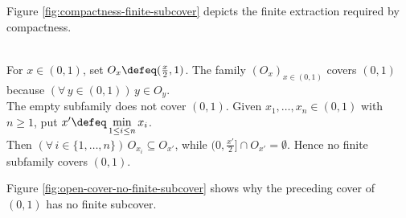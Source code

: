 Figure \ref{fig:compactness-finite-subcover} depicts the finite extraction required by compactness.
\begin{illustrationfigure}[H]
  \centering
  
  \caption{An arbitrary dashed cover of $K$ (left) is reduced to a finite solid subcover (right).}
  \label{fig:compactness-finite-subcover}
\end{illustrationfigure}

\begin{counterexample} \label{cex:open-interval-cover-without-finite-subcover} \\
For $x\in(0,1)$, set $O_x\defeq(\frac{x}{2},1)$. The family $(O_x)_{x\in(0,1)}$ covers $(0,1)$ because $(\forall\,y\in(0,1))\,y\in O_y$.\\
The empty subfamily does not cover $(0,1)$. Given $x_1,\ldots,x_n\in(0,1)$ with $n\geq1$, put $x'\defeq\min\limits_{1\leq i\leq n}x_i$.\\
Then $(\forall\,i\in\{1,\ldots,n\})\,O_{x_i}\subseteq O_{x'}$, while $(0,\frac{x'}{2}]\cap O_{x'}=\emptyset$. Hence no finite subfamily covers $(0,1)$.
\end{counterexample}

Figure \ref{fig:open-cover-no-finite-subcover} shows why the preceding cover of $(0,1)$ has no finite subcover.
\begin{illustrationfigure}[H]
  \centering
  
  \caption{For $x'=\min\limits_i x_i$, $(\forall\,i\in\{1,\ldots,n\})\,O_{x_i}\subseteq O_{x'}$, while $(0,\frac{x'}{2}]$ remains uncovered.}
  \label{fig:open-cover-no-finite-subcover}
\end{illustrationfigure}

